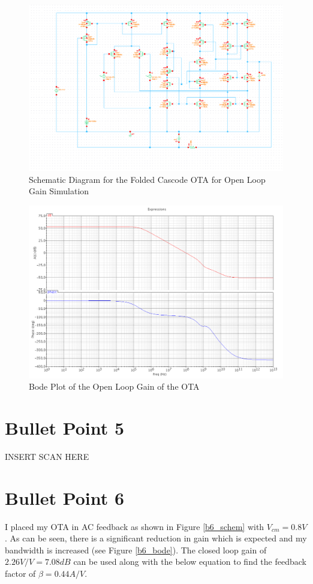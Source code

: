 \documentclass{article}
\begin{document}
\begin{figure}[H]
\centering
\includegraphics[width=7in]{bullet4_schem.png}
\caption{Schematic Diagram for the Folded Cascode OTA for Open Loop Gain Simulation}
\label{b4_schem}
\end{figure}

\begin{figure}[H]
\centering
\includegraphics[width=7in]{bullet4_bode.png}
\caption{Bode Plot of the Open Loop Gain of the OTA}
\label{b4_bode}
\end{figure}
\newpage

\section{Bullet Point 5}
INSERT SCAN HERE

\section{Bullet Point 6}
I placed my OTA in AC feedback as shown in Figure \ref{b6_schem} with $V_{cm} = 0.8V$. As can be seen, there is a significant reduction in gain which is expected and my bandwidth is increased (see Figure \ref{b6_bode}). The closed loop gain of $2.26V/V = 7.08dB$ can be used along with the below equation to find the feedback factor of $\beta = 0.44A/V$.
\end{document}
